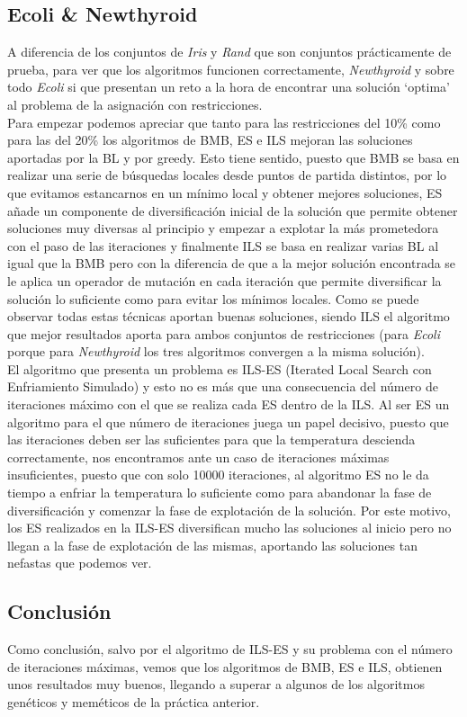 \subsection{Ecoli \& Newthyroid}
A diferencia de los conjuntos de \emph{Iris} y \emph{Rand} que son conjuntos prácticamente de prueba, para ver que los algoritmos funcionen correctamente,
\emph{Newthyroid} y sobre todo \emph{Ecoli} si que presentan un reto a la hora de encontrar una solución `optima' al problema de la asignación con restricciones.\\
Para empezar podemos apreciar que tanto para las restricciones del 10\% como para las del 20\% los algoritmos de BMB, ES e ILS mejoran las soluciones aportadas por la BL y por greedy. Esto tiene sentido, puesto que BMB se basa en realizar una serie de búsquedas locales desde puntos de partida distintos, por lo que evitamos estancarnos en un mínimo local y obtener mejores soluciones, ES añade un componente de diversificación inicial de la solución que permite obtener soluciones muy diversas al principio y empezar a explotar la más prometedora con el paso de las iteraciones y finalmente ILS se basa en realizar varias BL al igual que la BMB pero con la diferencia de que a la mejor solución encontrada se le aplica un operador de mutación en cada iteración que permite diversificar la solución lo suficiente como para evitar los mínimos locales. Como se puede observar todas estas técnicas aportan buenas soluciones, siendo ILS el algoritmo que mejor resultados aporta para ambos conjuntos de restricciones (para \emph{Ecoli} porque para \emph{Newthyroid} los tres algoritmos convergen a la misma solución).
\\
El algoritmo que presenta un problema es ILS-ES (Iterated Local Search con Enfriamiento Simulado) y esto no es más que una consecuencia del número de iteraciones máximo con el que se realiza cada ES dentro de la ILS. Al ser ES un algoritmo para el que número de iteraciones juega un papel decisivo, puesto que las iteraciones deben ser las suficientes para que la temperatura descienda correctamente, nos encontramos ante un caso de iteraciones máximas insuficientes, puesto que con solo 10000 iteraciones, al algoritmo ES no le da tiempo a enfriar la temperatura lo suficiente como para abandonar la fase de diversificación y comenzar la fase de explotación de la solución. Por este motivo, los ES realizados en la ILS-ES diversifican mucho las soluciones al inicio pero no llegan a la fase de explotación de las mismas, aportando las soluciones tan nefastas que podemos ver.


\subsection{Conclusión}
Como conclusión, salvo por el algoritmo de ILS-ES y su problema con el número de iteraciones máximas, vemos que los algoritmos de BMB, ES e ILS, obtienen unos resultados muy buenos, llegando a superar a algunos de los algoritmos genéticos y meméticos de la práctica anterior.
